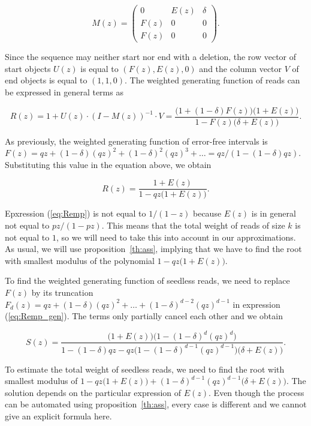 \documentclass{article}
\begin{document}
\begin{equation*}
M(z) = \left(
\begin{matrix}
0    & E(z) & \delta  \\
F(z) & 0    & 0       \\
F(z) & 0    & 0
\end{matrix}
\right).
\end{equation*}

Since the sequence may neither start nor end with a deletion, the row
vector of start objects $U(z)$ is equal to $(F(z), E(z), 0)$ and the
column vector $V$ of end objects is equal to $(1,1,0)$. The weighted
generating function of reads can be expressed in general terms as

\begin{equation}
\label{eq:Remp_gen}
R(z) = 1 + U(z) \cdot (I-M(z))^{-1} \cdot V =
\frac{\big(1+(1-\delta)F(z)\big)\big(1+E(z)\big)}
   {1-F(z)\big(\delta+E(z)\big)}.
\end{equation}

As previously, the weighted generating function of error-free intervals is
$F(z) = qz + (1-\delta)(qz)^2 + (1-\delta)^2(qz)^3 + \ldots =
qz/(1-(1-\delta)qz)$. Substituting this value in the equation above, we
obtain

\begin{equation}
\label{eq:Remp}
R(z) = \frac{1+E(z)}{1-qz\big(1+E(z)\big)}.
\end{equation}

Epxression (\ref{eq:Remp}) is not equal to $1/(1-z)$ because $E(z)$ is in
general not equal to $pz/(1-pz)$. This means that the total weight of
reads of size $k$ is not equal to $1$, so we will need to take this
into account in our approximations. As usual, we will use
proposition~\ref{th:ass}, implying that we have to find the root with
smallest modulus of the polynomial $1-qz\big(1+E(z)\big)$.

To find the weighted generating function of seedless reads, we need to
replace $F(z)$ by its truncation $F_d(z) = qz + (1-\delta)(qz)^2 + \ldots
+ (1-\delta)^{d-2}(qz)^{d-1}$ in expression (\ref{eq:Remp_gen}). The terms
only partially cancel each other and we obtain

\begin{equation}
\label{eq:Semp}
S(z) = \frac{\big(1+E(z)\big)\big( 1-(1-\delta)^d(qz)^d \big)}
{1-(1-\delta)qz-qz\big(1-(1-\delta)^{d-1}(qz)^{d-1}\big)
\big(\delta+E(z)\big) }.
\end{equation}

To estimate the total weight of seedless reads, we need to find the root
with smallest modulus of $1-qz\big(1+E(z)\big) +
(1-\delta)^{d-1}(qz)^{d-1}\big(\delta+E(z)\big)$. The solution depends on
the particular expression of $E(z)$. Even though the process can be
automated using proposition~\ref{th:ass}, every case is different and
we cannot give an explicit formula here.
\end{document}
